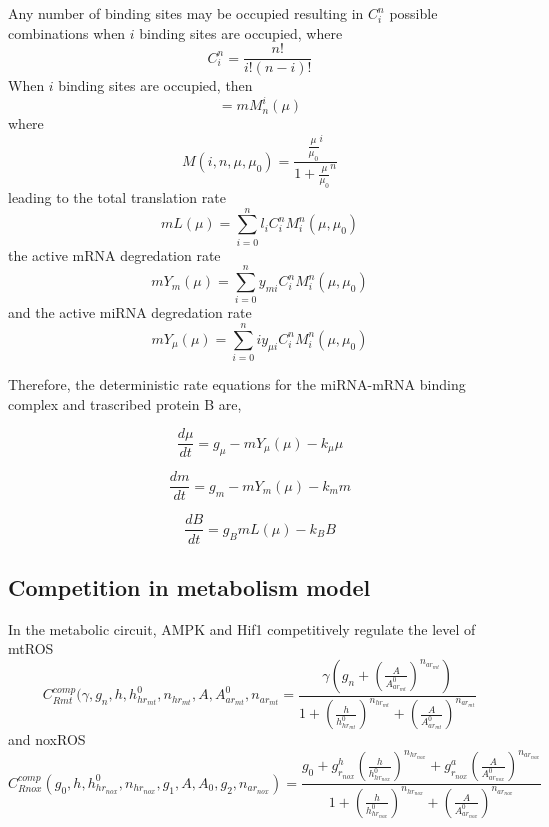 \documentclass{article}
\begin{document}
Any number of binding sites may be occupied resulting in $C_i^n$ possible combinations  when $i$ binding sites are occupied, where
%
\begin{equation}
C_i^n = \frac{n!}{i!(n-i)!}
\end{equation}
%
When $i$ binding sites are occupied, then%
\begin{equation}
[m_i] = m M_n^i (\mu)
\end{equation}
%
where%
%
\begin{equation}
M(i, n, \mu, \mu_0)= \frac{\frac{\mu}{\mu_0}^{i}}{1+\frac{\mu}{\mu_0}^n}
\end{equation}
%
leading to the total translation rate %
\begin{equation}
mL(\mu) = \sum_{i=0}^{n}l_{i}C_i^nM_i^n(\mu,\mu_0)
 \end{equation}
the active mRNA degredation rate%
\begin{equation}
        m Y_m (\mu) = \sum_{i=0}^{n}y_{mi}C_i^nM_i^n(\mu,\mu_0)
 \end{equation}
 and the active miRNA degredation rate%
\begin{equation}
                m Y_\mu(\mu) = \sum_{i=0}^{n}i y_{\mu i}C_i^nM_i^n(\mu,\mu_0)
\end{equation}

Therefore, the deterministic rate equations for the miRNA-mRNA binding complex and trascribed protein B are,

\begin{equation}
\frac{d\mu}{dt} = g_\mu - mY_\mu (\mu) -k_\mu \mu
\end{equation}

\begin{equation}
\frac{dm}{dt} = g_m - mY_m(\mu) - k_m m
\end{equation}

\begin{equation}
\frac{dB}{dt} = g_B mL(\mu)-k_B B
\end{equation}


\subsection{Competition in metabolism model}

In the metabolic circuit, AMPK and Hif1 competitively regulate the level of mtROS
\begin{equation}
        C^{comp}_{Rmt}(\gamma,g_n,h,h^0_{hr_{mt}},n_{hr_{mt}},A,A^0_{ar_{mt}},n_{ar_{mt}} = \frac{\gamma (g_n+(\frac{A}{A^0_{ar_{mt}}})^{n_{ar_{mt}}})} {1+(\frac{h}{h^0_{hr_{mt}}})^{n_{hr_{mt}}}+(\frac{A}{A^0_{ar_{mt}}})^{n_{ar_{mt}}}}
\end{equation}
 and noxROS
\begin{equation}
        C^{comp}_{Rnox}(g_0,h,h^0_{hr_{nox}},n_{hr_{nox}},g_1,A,A_0,g_2,n_{ar_{nox}})=\frac{g_0+g^h_{r_{nox}}(\frac{h}{h^0_{hr_{nox}}})^{n_{hr_{nox}}}+g^a_{r_{nox}}(\frac{A}{A^0_{ar_{nox}}})^{n_{ar_{nox}}}}{1+(\frac{h}{h^0_{hr_{nox}}})^{n_{hr_{nox}}}+(\frac{A}{A^0_{ar_{nox}}})^{n_{ar_{nox}}}}
\end{equation}
\end{document}
